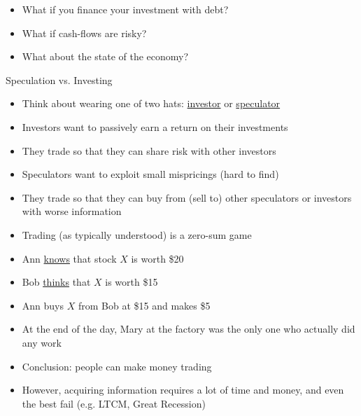 \documentclass{beamer}
\begin{document}
\begin{frame}{}
	\begin{itemize}
		\item What if you finance your investment with debt?
		\item What if cash-flows are risky?
		\item What about the state of the economy?
	\end{itemize}
\end{frame}


\begin{frame}
\begin{center}
\Huge Speculation vs. Investing
\end{center}
\end{frame}


\begin{frame}{}
	\begin{itemize}
		\item Think about wearing one of two hats:  \underline{investor} or \underline{speculator}
		\item Investors want to passively earn a return on their investments
		\item They trade so that they can share risk with other investors
		\item Speculators want to exploit small mispricings (hard to find)
		\item They trade so that they can buy from (sell to) other speculators or investors with worse information
	\end{itemize}
\end{frame}

\begin{frame}{}
	\begin{itemize}
		\item Trading (as typically understood) is a zero-sum game
		\item Ann \underline{knows} that stock $X$ is worth \$20
		\item Bob \underline{thinks} that $X$ is worth \$15
		\item Ann buys $X$ from Bob at \$15 and makes \$5
		\item At the end of the day, Mary at the factory was the only one who actually did any work
		\item Conclusion: people can make money trading
		\item However, acquiring information requires a lot of time and money, and even the best fail (e.g. LTCM, Great Recession)
	\end{itemize}
\end{frame}
\end{document}
